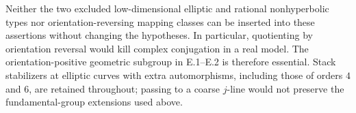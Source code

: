 Neither the two excluded low-dimensional elliptic and rational
nonhyperbolic types nor orientation-reversing mapping classes can be
inserted into these assertions without changing the hypotheses.
In particular, quotienting by orientation reversal would kill complex
conjugation in a real model.  The orientation-positive geometric
subgroup in E.1--E.2 is therefore essential.  Stack stabilizers at
elliptic curves with extra automorphisms, including those of orders
$4$ and $6$, are retained throughout; passing to a coarse $j$-line
would not preserve the fundamental-group extensions used above.


